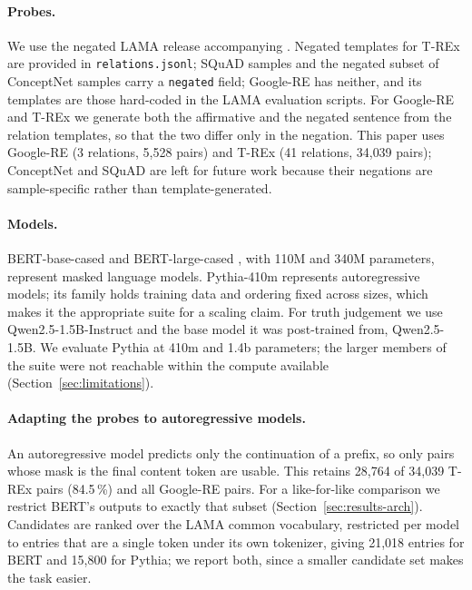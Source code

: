 \documentclass{article}
\begin{document}
\paragraph{Probes.} We use the negated LAMA release accompanying \citet{kassner2020}. Negated
templates for T-REx are provided in \texttt{relations.jsonl}; SQuAD samples and the negated subset of ConceptNet samples carry a
\texttt{negated} field; Google-RE has neither, and its templates are those hard-coded in the LAMA
evaluation scripts. For Google-RE and T-REx we generate both the affirmative and the negated sentence
from the relation templates, so that the two differ only in the negation. This paper uses Google-RE
(3 relations, 5{,}528 pairs) and T-REx \citep{elsahar2018} (41 relations, 34{,}039 pairs); ConceptNet and SQuAD are left
for future work because their negations are sample-specific rather than template-generated.

\paragraph{Models.} BERT-base-cased and BERT-large-cased \citep{devlin2019}, with 110M and 340M parameters, represent masked language models.
Pythia-410m \citep{biderman2023} represents autoregressive models; its family holds training data and
ordering fixed across sizes, which makes it the appropriate suite for a scaling claim. For truth
judgement we use Qwen2.5-1.5B-Instruct \citep{qwen2025} and the base model it was post-trained from, Qwen2.5-1.5B.
We evaluate Pythia at 410m and 1.4b parameters; the larger members of the suite
were not reachable within the compute available (Section~\ref{sec:limitations}).

\paragraph{Adapting the probes to autoregressive models.} An autoregressive model predicts only the
continuation of a prefix, so only pairs whose mask is the final content token are usable. This retains
28{,}764 of 34{,}039 T-REx pairs (84.5\,\%) and all Google-RE pairs. For a like-for-like comparison we
restrict BERT's outputs to exactly that subset (Section~\ref{sec:results-arch}). Candidates are ranked over the
LAMA common vocabulary, restricted per model to entries that are a single token under its own
tokenizer, giving 21{,}018 entries for BERT and 15{,}800 for Pythia; we report both, since a smaller
candidate set makes the task easier.
\end{document}
